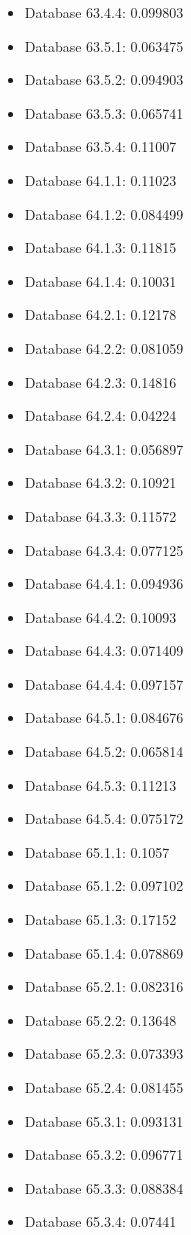 \begin{itemize}
\item Database 63.4.4: 0.099803
\item Database 63.5.1: 0.063475
\item Database 63.5.2: 0.094903
\item Database 63.5.3: 0.065741
\item Database 63.5.4: 0.11007
\item Database 64.1.1: 0.11023
\item Database 64.1.2: 0.084499
\item Database 64.1.3: 0.11815
\item Database 64.1.4: 0.10031
\item Database 64.2.1: 0.12178
\item Database 64.2.2: 0.081059
\item Database 64.2.3: 0.14816
\item Database 64.2.4: 0.04224
\item Database 64.3.1: 0.056897
\item Database 64.3.2: 0.10921
\item Database 64.3.3: 0.11572
\item Database 64.3.4: 0.077125
\item Database 64.4.1: 0.094936
\item Database 64.4.2: 0.10093
\item Database 64.4.3: 0.071409
\item Database 64.4.4: 0.097157
\item Database 64.5.1: 0.084676
\item Database 64.5.2: 0.065814
\item Database 64.5.3: 0.11213
\item Database 64.5.4: 0.075172
\item Database 65.1.1: 0.1057
\item Database 65.1.2: 0.097102
\item Database 65.1.3: 0.17152
\item Database 65.1.4: 0.078869
\item Database 65.2.1: 0.082316
\item Database 65.2.2: 0.13648
\item Database 65.2.3: 0.073393
\item Database 65.2.4: 0.081455
\item Database 65.3.1: 0.093131
\item Database 65.3.2: 0.096771
\item Database 65.3.3: 0.088384
\item Database 65.3.4: 0.07441

\end{itemize}
